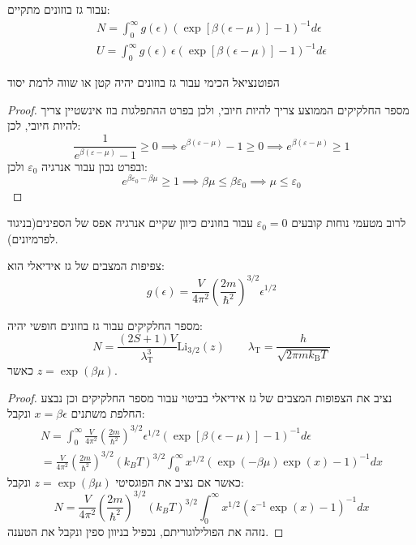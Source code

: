\documentclass{tstextbook}
\begin{document}
\begin{reminder}
עבור גז בוזונים מתקיים:
$$\begin{gather}{N=\int_{0}^{\infty}g\left( \epsilon \right)\left(\exp\left[ \beta\left( \epsilon-\mu \right) \right]-1\right)^{-1}d\epsilon}\\  {U=\int_{0}^{\infty}g\left( \epsilon \right)\,\epsilon\left(\exp\left[ \beta\left( \epsilon-\mu \right) \right]-1\right)^{-1}d\epsilon} 
\end{gather}$$

\end{reminder}
\begin{proposition}
הפוטנציאל הכימי עבור גז בוזונים יהיה קטן או שווה לרמת יסוד

\end{proposition}
\begin{proof}
מספר החלקיקים הממוצע צריך להיות חיובי, ולכן בפרט ההתפלגות בוז אינשטיין צריך להיות חיובי, לכן:
$$\frac{1}{e^{ \beta\left( \varepsilon-\mu \right) }-1}\geq 0\implies e^{ \beta\left( \varepsilon-\mu \right) }-1\geq 0\implies e^{ \beta\left( \varepsilon-\mu \right) }\geq 1$$
ובפרט נכון עבור אנרגיה \(\varepsilon_{0}\) ולכן:
$$e^{ \beta\varepsilon_{0}-\beta \mu }\geq 1\implies \beta \mu \leq \beta\varepsilon_{0}\implies \mu\leq\varepsilon_{0}$$

\end{proof}
\begin{remark}
לרוב מטעמי נוחות קובעים \(\varepsilon_{0}=0\) עבור בוזונים כיוון שקיים אנרגיה אפס של הספינים(בניגוד לפרמיונים).

\end{remark}
\begin{reminder}
צפיפות המצבים של גז אידיאלי הוא:
$$g\left( \epsilon \right)=\frac{V}{4\pi^{2}}\left(\frac{2m}{\hbar^{2}}\right)^{3/2}\epsilon^{1/2}$$

\end{reminder}
\begin{proposition}
מספר החלקיקים עבור גז בוזונים חופשי יהיה:
$$N=\frac{(2S+1)V}{\lambda_{\mathrm{T}}^{3}}\mathrm{Li}_{3/2}(z)\qquad \lambda_{\mathrm{T}}=\frac{h}{\sqrt{2\pi m k_{\mathrm{B}}T}}$$
כאשר \(z=\exp\left( \beta \mu \right)\).

\end{proposition}
\begin{proof}
נציב את הצפופות המצבים של גז אידיאלי בביטוי עבור מספר החלקיקים וכן נבצע החלפת משתנים \(x=\beta\epsilon\) ונקבל:
$$\begin{gather}N=\int_{0}^{\infty}\frac{V}{4\pi^{2}}\left(\frac{2m}{\hbar^{2}}\right)^{3/2}\epsilon^{1/2}\left(\exp\left[ \beta\left( \epsilon-\mu \right) \right]-1\right)^{-1}d\epsilon\\={\frac{V}{4\pi^{2}}}\left({\frac{2m}{\hbar^{2}}}\right)^{3/2}(k_{B}T)^{3/2}\int_{0}^{\infty}x^{1/2}\left(\exp\left( -\beta\mu \right)\exp(x)-1\right)^{-1}d x 
\end{gather}$$
כאשר אם נציב את הפוגסיטי \(z=\exp\left( \beta \mu \right)\) ונקבל:
$$N=\frac{V}{4\pi^{2}}\left(\frac{2m}{\hbar^{2}}\right)^{3/2}\left(k_{B}T\right)^{3/2}\int_{0}^{\infty}x^{1/2}\left(z^{-1}\exp(x)-1\right)^{-1}d x$$
נזהה את הפולילוגוריתם, נכפיל בניוון ספין ונקבל את הטענה.

\end{proof}
\end{document}
